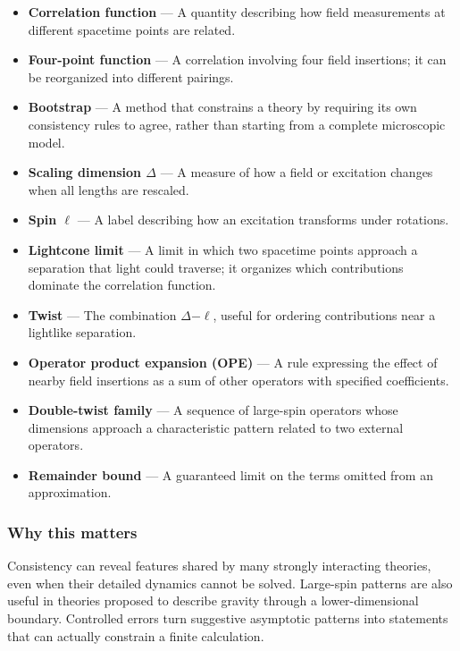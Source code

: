 \documentclass[
  11pt,
]{article}
\begin{document}
\begin{itemize}
\item
  \textbf{Correlation function} --- A quantity describing how field
  measurements at different spacetime points are related.
\item
  \textbf{Four-point function} --- A correlation involving four field
  insertions; it can be reorganized into different pairings.
\item
  \textbf{Bootstrap} --- A method that constrains a theory by requiring
  its own consistency rules to agree, rather than starting from a
  complete microscopic model.
\item
  \textbf{Scaling dimension \ensuremath{\Delta}} --- A measure of how a
  field or excitation changes when all lengths are rescaled.
\item
  \textbf{Spin \ensuremath{\ell}} --- A label describing how an
  excitation transforms under rotations.
\item
  \textbf{Lightcone limit} --- A limit in which two spacetime points
  approach a separation that light could traverse; it organizes which
  contributions dominate the correlation function.
\item
  \textbf{Twist} --- The combination
  \ensuremath{\Delta}\ensuremath{-}\ensuremath{\ell}, useful for
  ordering contributions near a lightlike separation.
\item
  \textbf{Operator product expansion (OPE)} --- A rule expressing the
  effect of nearby field insertions as a sum of other operators with
  specified coefficients.
\item
  \textbf{Double-twist family} --- A sequence of large-spin operators
  whose dimensions approach a characteristic pattern related to two
  external operators.
\item
  \textbf{Remainder bound} --- A guaranteed limit on the terms omitted
  from an approximation.
\end{itemize}

\subsubsection{Why this matters}

Consistency can reveal features shared by many strongly interacting
theories, even when their detailed dynamics cannot be solved. Large-spin
patterns are also useful in theories proposed to describe gravity
through a lower-dimensional boundary. Controlled errors turn suggestive
asymptotic patterns into statements that can actually constrain a finite
calculation.
\end{document}
